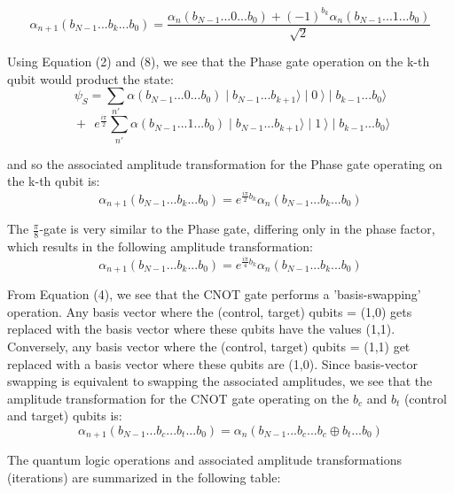 \documentclass[reqno]{amsart}
\theoremstyle{definition}
\theoremstyle{remark}
\begin{document}
\begin{equation}
\alpha_{n+1}(b_{N-1}...b_k...b_0)=\frac{\alpha_{n}(b_{N-1}...0...b_{0})+(-1)^{b_k} \alpha_{n}(b_{N-1}...1...b_{0})}{\sqrt{2}}
\end{equation}

\noindent
Using Equation (2) and (8), we see that the Phase gate operation on the k-th qubit would product the state:
\begin{equation}
\psi_S=\sum_{n'} \alpha(b_{N-1}...0...b_{0})\mid b_{N-1}...b_{k+1}\rangle\mid0\:\rangle\mid b_{k-1}...b_{0}\rangle 
\end{equation}
$$
\: + \:\:e^{ \frac{i\pi}{2}}\sum_{n'} \alpha(b_{N-1}...1...b_{0})\mid b_{N-1}...b_{k+1}\rangle\mid1\:\rangle\mid b_{k-1}...b_{0}\rangle
$$ 

\noindent
and so the associated amplitude transformation for the Phase gate operating on the k-th qubit is:
\begin{equation}
\alpha_{n+1}(b_{N-1}...b_k...b_0)=e^{ \frac{i\pi}{2} b_k}\alpha_{n}(b_{N-1}...b_k...b_0)
\end{equation}

\noindent
The $\frac{\pi}{8}$-gate is very similar to the Phase gate, differing only in the phase factor, which
results in the following amplitude transformation:
\begin{equation}
\alpha_{n+1}(b_{N-1}...b_k...b_0)=e^{ \frac{i\pi}{4} b_k}\alpha_{n}(b_{N-1}...b_k...b_0)
\end{equation}
 

\noindent
From Equation (4), we see that the CNOT gate performs a 'basis-swapping' operation. Any basis vector where the (control, target) qubits = (1,0) gets replaced with the basis vector where these qubits have the values (1,1). Conversely, any basis vector where the (control, target) qubits = (1,1) get replaced with a basis vector where these qubits are (1,0). Since basis-vector swapping is equivalent to swapping the associated amplitudes, we see that the amplitude transformation for the CNOT gate operating on the $b_c$ and $b_t$ (control and target) qubits is:
\begin{equation}
\alpha_{n+1}(b_{N-1}...b_c...b_t...b_0)=\alpha_{n}(b_{N-1}...b_c...b_c\oplus b_t...b_0)
\end{equation}

\noindent
The quantum logic operations and associated amplitude transformations (iterations) are summarized in the following table:
\end{document}
